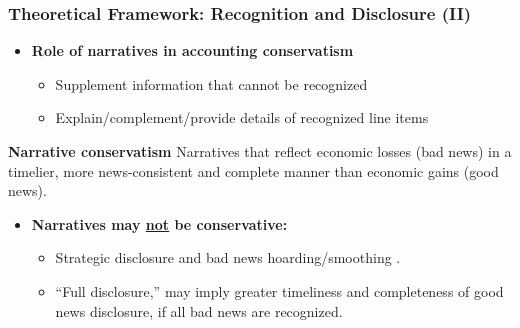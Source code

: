 \documentclass{beamer}
\begin{document}
\begin{frame}
\frametitle{Theoretical Framework: Recognition and Disclosure (II)}
\begin{itemize}
\normalsize
\item \textbf{Role of narratives in accounting conservatism} 
\begin{itemize}	
\item Supplement information that cannot be recognized
\item Explain/complement/provide details of recognized line items
\end{itemize}
\pause
\end{itemize}
\begin{block}{\footnotesize 
\textbf{Narrative conservatism}}
Narratives that reflect economic losses (bad news) in a timelier, more news-consistent and complete manner than economic gains (good news).
\end{block}

\pause
\begin{itemize}
\item \textbf{Narratives may \underline{not} be conservative:} 
\begin{itemize}
\item Strategic disclosure and bad news hoarding/smoothing \citep[e.g.,][]{kothariManagersWithholdBad2009,geAcquirersDiscloseGood2011,segalAreManagersStrategic2016,chapmanInformationOverloadDisclosure2019}.
\item ``Full disclosure,'' \citep{guayConservativeDisclosure2018} may imply greater timeliness and completeness of good news disclosure, if all bad news are recognized.
\end{itemize}

\end{itemize}





\end{frame}
\end{document}
